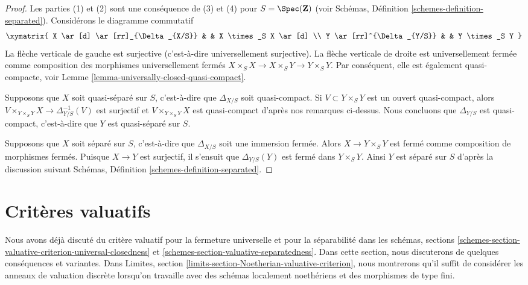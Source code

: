 \begin{proof}
Les parties (1) et (2) sont une conséquence de (3)
et (4) pour $S = \Spec(\mathbf{Z})$
(voir Schémas, Définition \ref{schemes-definition-separated}). Considérons
le diagramme commutatif
$$
\xymatrix{
X \ar[d] \ar[rr]_{\Delta_{X/S}} & & X \times_S X \ar[d] \\
Y \ar[rr]^{\Delta_{Y/S}} & & Y \times_S Y
}
$$
La flèche verticale de gauche est surjective (c’est-à-dire universellement
surjective). La flèche verticale de droite est universellement
fermée comme composition
des morphismes universellement fermés $X \times_S X \to X \times_S Y \to Y \times_S Y$. Par conséquent,
elle est également
quasi-compacte, voir Lemme \ref{lemma-universally-closed-quasi-compact}.

\medskip\noindent
Supposons que $X$ soit quasi-séparé sur $S$, c'est-à-dire
que $\Delta_{X/S}$ soit quasi-compact. Si $V \subset Y \times_S Y$ est
un ouvert quasi-compact, alors $V \times_{Y \times_S Y} X \to \Delta_{Y/S}^{-1}(V)$ est surjectif et $V \times_{Y \times_S Y} X$
est quasi-compact d'après nos remarques ci-dessus. Nous concluons que
$\Delta_{Y/S}$ est quasi-compact, c'est-à-dire que $Y$ est quasi-séparé
sur $S$.

\medskip\noindent
Supposons que $X$ soit séparé sur $S$, c'est-à-dire que
$\Delta_{X/S}$ soit une immersion fermée. Alors $X \to Y \times_S Y$
est fermé comme composition de morphismes fermés.
Puisque $X \to Y$ est surjectif, il s'ensuit que $\Delta_{Y/S}(Y)$ est fermé dans
$Y \times_S Y$. Ainsi $Y$ est séparé sur $S$ d'après
la discussion suivant Schémas, Définition \ref{schemes-definition-separated}.
\end{proof}








\section{Critères valuatifs}
\label{section-valuative-criteria}

\noindent
Nous avons déjà discuté du critère valuatif pour la fermeture universelle
et pour la séparabilité dans
les schémas, sections \ref{schemes-section-valuative-criterion-universal-closedness} et \ref{schemes-section-valuative-separatedness}. Dans cette
section, nous discuterons de quelques
conséquences et variantes. Dans Limites, section \ref{limits-section-Noetherian-valuative-criterion},
nous montrerons qu'il suffit de considérer les anneaux
de valuation discrète lorsqu'on travaille avec
des schémas localement noethériens et des morphismes
de type fini.

